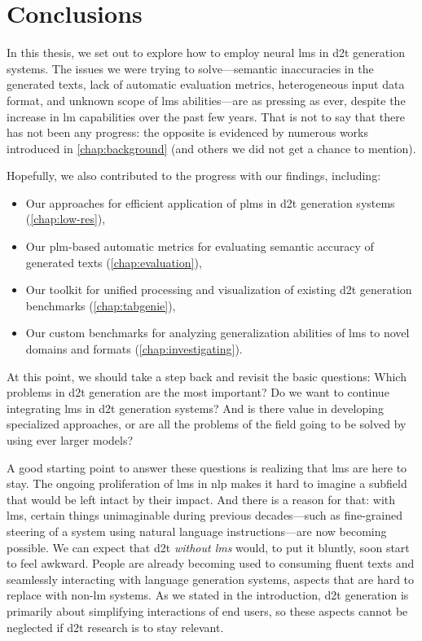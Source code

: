 
\chapter{Conclusions}
\label{chap:conclusions}

In this thesis, we set out to explore how to employ neural \acp{lm} in \ac{d2t} generation systems. The issues we were trying to solve---semantic inaccuracies in the generated texts, lack of automatic evaluation metrics, heterogeneous input data format, and unknown scope of \acp{lm} abilities---are as pressing as ever, despite the increase in \ac{lm} capabilities over the past few years. That is not to say that there has not been any progress: the opposite is evidenced by numerous works introduced in \autoref{chap:background} (and others we did not get a chance to mention).


Hopefully, we also contributed to the progress with our findings, including:
\begin{itemize}
    \item Our approaches for efficient application of \acp{plm} in \ac{d2t} generation systems (\autoref{chap:low-res}),
    \item Our \ac{plm}-based automatic metrics for evaluating semantic accuracy of generated texts (\autoref{chap:evaluation}),
    \item Our toolkit for unified processing and visualization of existing \ac{d2t} generation benchmarks (\autoref{chap:tabgenie}),
    \item Our custom benchmarks for analyzing generalization abilities of \acp{lm} to novel domains and formats (\autoref{chap:investigating}).
\end{itemize}

At this point, we should take a step back and revisit the basic questions: Which problems in \ac{d2t} generation are the most important? Do we want to continue integrating \aclp{lm} in \ac{d2t} generation systems? And is there value in developing specialized approaches, or are all the problems of the field going to be solved by using ever larger models?

A good starting point to answer these questions is realizing that \aclp{lm} are here to stay. The ongoing proliferation of \acp{lm} in \acl{nlp} \cite{min2023recent,zhao2023survey,naveed2024comprehensive} makes it hard to imagine a subfield that would be left intact by their impact. And there is a reason for that: with \acp{lm}, certain things unimaginable during previous decades---such as fine-grained steering of a system using natural language instructions---are now becoming possible. We can expect that \ac{d2t} \emph{without \acp{lm}} would, to put it bluntly, soon start to feel awkward. People are already becoming used to consuming fluent texts and seamlessly interacting with language generation systems, aspects that are hard to replace with non-\ac{lm} systems. As we stated in the introduction, \ac{d2t} generation is primarily about simplifying interactions of end users, so these aspects cannot be neglected if \ac{d2t} research is to stay relevant.

